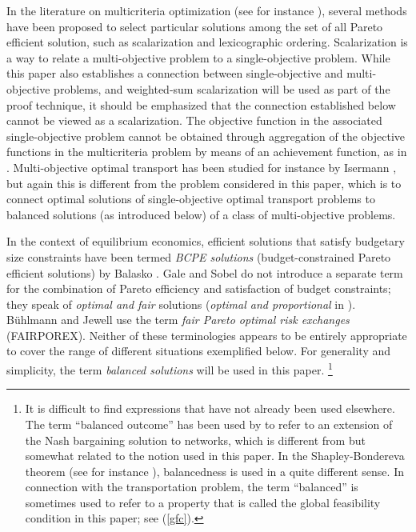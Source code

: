 \documentclass{article}
\theoremstyle{definition}
\renewcommand{\baselinestretch}{1.5}
\let\origfootnote\footnote
\renewcommand{\footnote}[1]{%
   \begingroup
   \renewcommand{\baselinestretch}{1}%
   \origfootnote{#1}%
   \endgroup}
\begin{document}
In the literature on multicriteria optimization (see for instance \cite{Ehrgott}), several methods have been proposed to select particular solutions among the set of all Pareto efficient solution, such as scalarization and lexicographic ordering. Scalarization is a way to relate a multi-objective problem to a single-objective problem. While this paper also establishes a connection between single-objective and multi-objective problems, and weighted-sum scalarization will be used as part of the proof technique, it should be emphasized that the connection established below cannot be viewed as a scalarization. The objective function in the associated single-objective problem cannot be obtained through aggregation of the objective functions in the multicriteria problem by means of an achievement function, as in
\cite[Section 4.6]{Ehrgott}. Multi-objective optimal transport has been studied for instance by Isermann \cite{Isermann79}, but again this is different from the problem considered in this paper, which is to connect optimal solutions of single-objective optimal transport problems to balanced solutions (as introduced below) of a class of multi-objective problems.

In the context of equilibrium economics, efficient solutions that satisfy budgetary size constraints have been termed \emph{BCPE solutions} (budget-constrained Pareto efficient solutions) by Ba\-lasko \cite{Balasko}. Gale and Sobel \cite{Gale79} do not introduce a separate term for the combination of Pareto efficiency and satisfaction of budget constraints; they speak of \emph{optimal and fair} solutions (\emph{optimal and proportional} in \cite{Gale82}). B\"{u}hlmann and Jewell \cite{Buehlmann79} use the term \emph{fair Pareto optimal risk exchanges} (FAIRPOREX). Neither of these terminologies appears to be entirely appropriate to cover the range of different situations exemplified below. For generality and simplicity, the term \emph{balanced solutions} will be used in this paper.\footnote{It is difficult to find expressions that have not already been used elsewhere. The term ``balanced outcome'' has been used by \cite{Kleinberg} to refer to an extension of the Nash bargaining solution to networks, which is different from but somewhat related to the notion used in this paper. In the Shapley-Bondereva theorem (see for instance \cite{Myerson}), balancedness is used in a quite different sense. In connection with the transportation problem, the term ``balanced'' is sometimes used to refer to a property that is called the global feasibility condition in this paper; see (\ref{gfc}).}
\end{document}

